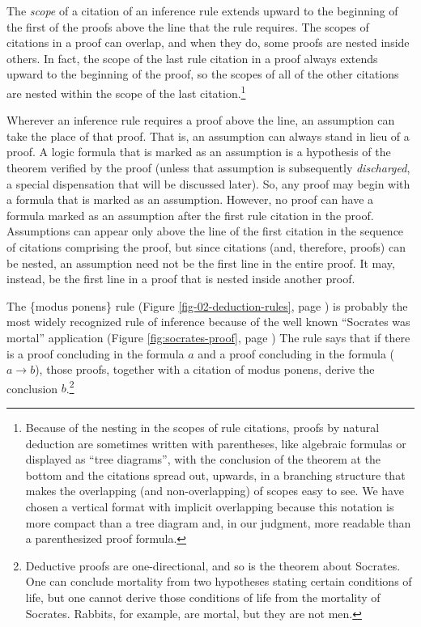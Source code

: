 The \emph{scope} of a 
citation of an inference rule
extends upward to the beginning of the first of the proofs
above the line that the rule requires.
The scopes of citations in a proof can overlap,
and when they do, some proofs are nested inside others.
In fact, the scope of the last rule citation in a proof
always extends upward to the beginning of the proof,
so the scopes of all of the other citations are nested
within the scope of the last citation.\footnote{Because
of the nesting in the scopes of rule citations,
proofs by natural deduction
are sometimes written with parentheses,
like algebraic formulas
or displayed as ``tree diagrams'',
with the conclusion of the theorem at the bottom and
the citations spread out, upwards,
in a branching structure
that makes the overlapping (and non-overlapping)
of scopes easy to see.
We have chosen a vertical format with implicit
overlapping because this notation is more compact
than a tree diagram and, in our judgment,
more readable than a parenthesized proof formula.}

Wherever an inference rule requires a proof above the line,
an assumption can take the place of that proof.
That is,
an assumption can always stand in lieu of a proof.
A logic formula that is marked as an assumption
is a hypothesis of the theorem verified by the proof
(unless that assumption is subsequently \emph{discharged},
a special dispensation
that will be discussed later).
So, any proof may begin with a formula
that is marked as an assumption.
However, no proof can have
a formula marked as an assumption after
the first rule citation in the proof.
Assumptions can appear only above the line
of the first citation in the sequence of citations
comprising the proof, but since citations
(and, therefore, proofs) can be nested,
an assumption need not be the first line in
the entire proof.
It may, instead, be the first line
in a proof that is nested inside another proof.

The \{modus ponens\} rule
(Figure \ref{fig-02-deduction-rules}, page \pageref{fig-02-deduction-rules})
is probably the most widely recognized rule of inference because
of the well known ``Socrates was mortal'' application
(Figure \ref{fig:socrates-proof}, page \pageref{fig:socrates-proof})
The rule says that if there is a proof concluding in
the formula $a$ and a proof concluding in the formula ($a \rightarrow b$),
those proofs, together with a citation of modus ponens,
derive the conclusion $b$.\footnote{Deductive
proofs are one-directional,
and so is the theorem about Socrates.
One can conclude mortality from two hypotheses stating certain conditions of life,
but one cannot derive those conditions of life from the mortality of Socrates.
Rabbits, for example, are mortal, but they are not men.}

